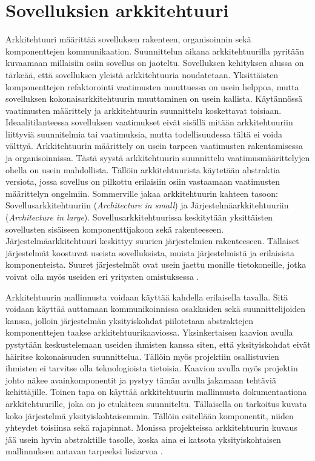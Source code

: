 \documentclass[utf8]{gradu3}
\begin{document}
\chapter{Sovelluksien arkkitehtuuri}
Arkkitehtuuri määrittää sovelluksen rakenteen, organisoinnin sekä komponenttejen kommunikaation. Suunnittelun aikana arkkitehtuurilla pyritään kuvaamaan millaisiin osiin sovellus on jaoteltu. Sovelluksen kehityksen alussa on tärkeää, että sovelluksen yleistä arkkitehtuuria noudatetaan. Yksittäisten komponenttejen refaktorointi vaatimusten muuttuessa on usein helppoa, mutta sovelluksen kokonaisarkkitehtuurin muuttaminen on usein kallista. Käytännössä vaatimusten määrittely ja arkkitehtuurin suunnittelu koskettavat toisiaan. Ideaalitilanteessa sovelluksen vaatimukset eivät sisällä mitään arkkitehtuuriin liittyviä suunnitelmia tai vaatimuksia, mutta todellisuudessa tältä ei voida välttyä. Arkkitehtuurin määrittely on usein tarpeen vaatimusten rakentamisessa ja organisoinnissa. Tästä syystä arkkitehtuurin suunnittelu vaatimusmäärittelyjen ohella on usein mahdollista. Tällöin arkkitehtuurista käytetään abstraktia versiota, jossa sovellus on pilkottu erilaisiin osiin vastaamaan vaatimusten määrittelyn ongelmiin. Sommerville jakaa arkkitehtuurin kahteen tasoon: Sovellusarkkitehtuuriin (\emph{Architecture in small}) ja Järjestelmäarkkitehtuuriin (\emph{Architecture in large}). Sovellusarkkitehtuurissa keskitytään yksittäisten sovellusten sisäiseen komponenttijakoon sekä rakenteeseen.  Järjestelmäarkkitehtuuri keskittyy suurien järjestelmien rakenteeseen. Tällaiset järjestelmät koostuvat useista sovelluksista, muista järjestelmistä ja erilaisista komponenteista. Suuret järjestelmät ovat usein jaettu monille tietokoneille, jotka voivat olla myös useiden eri yritysten omistuksessa \parencite[s. 148]{Sommerville}.

Arkkitehtuurin mallinnusta voidaan käyttää kahdella erilaisella tavalla. Sitä voidaan käyttää auttamaan kommunikoinnissa osakkaiden sekä suunnittelijoiden kanssa, jolloin järjestelmän yksityiskohdat piilotetaan abstraktejen komponenttejen taakse arkkitehtuurikaaviossa. Yksinkertaisen kaavion avulla pystytään keskustelemaan useiden ihmisten kanssa siten, että yksityiskohdat eivät häiritse kokonaisuuden suunnittelua. Tällöin myös projektiin osallistuvien ihmisten ei tarvitse olla teknologioista tietoisia. Kaavion avulla myös projektin johto näkee avainkomponentit ja pystyy tämän avulla jakamaan tehtäviä kehittäjille. Toinen tapa on käyttää arkkitehtuurin mallinnusta dokumentaationa arkkitehtuurille, joka on jo etukäteen suunniteltu. Tällaisella on tarkoitus kuvata koko järjestelmä yksityiskohtaisemmin. Tällöin esitellään komponentit, niiden yhteydet toisiinsa sekä rajapinnat. Monissa projekteissa arkkitehtuurin kuvaus jää usein hyvin abstraktille tasolle, koska aina ei katsota yksityiskohtaisen mallinnuksen antavan tarpeeksi lisäarvoa \parencite[s. 150]{Sommerville}.
\end{document}
